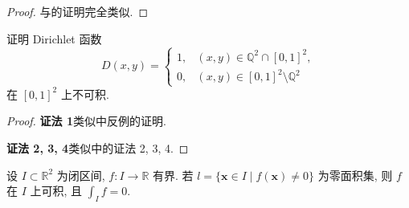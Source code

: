 \begin{proof}
与的证明完全类似.
\end{proof}

\begin{example}\label{ex:10.1.3}
证明 Dirichlet 函数
\[
  D(x, y) = \begin{cases}
    1, & (x, y) \in \mathbb{Q}^{2} \cap [0, 1]^{2}, \\
    0, & (x, y) \in [0, 1]^{2} \setminus \mathbb{Q}^{2}
  \end{cases}
\]
在 $[0, 1]^{2}$ 上不可积.
\end{example}

\begin{proof}
\textbf{证法 1}\quad 类似中反例的证明.

\textbf{证法 2, 3, 4}\quad 类似中的证法 2, 3, 4.
\end{proof}

\begin{example}\label{ex:10.1.4}
设 $I \subset \mathbb{R}^2$ 为闭区间, $f\colon I \to \mathbb{R}$ 有界. 若 $l = \{\boldsymbol{x} \in I \mid f(\boldsymbol{x}) \neq 0\}$ 为零面积集, 则 $f$ 在 $I$ 上可积, 且 $\displaystyle\int_I f = 0$.
\end{example}

